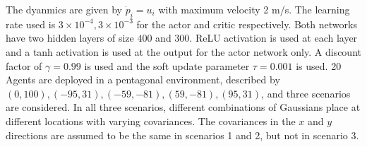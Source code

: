 \documentclass[landscape,a0paper,fontscale=0.292]{baposter}
\begin{document}
\begin{poster}
{
	The dyanmics are given by $\dot{p}_i = u_i$ with maximum velocity 2 m/s. The learning rate used is $3 \times 10^{-4}, 3\times 10^{-3}$ for the actor and critic respectively. Both networks have two hidden layers of size $400$ and $300$. ReLU activation is used at each layer and a tanh activation is used at the output for the actor network only. A discount factor of $\gamma = 0.99$ is used and the soft update parameter $\tau = 0.001$ is used. 20 Agents are deployed in a pentagonal environment, described by $(0,100), (-95,31), (-59,-81), (59,-81), (95,31)$, and three scenarios are considered. In all three scenarios, different combinations of Gaussians place at different locations with varying covariances. The covariances in the $x$ and $y$ directions are assumed to be the same in scenarios 1 and 2, but not in scenario 3.
}


\end{poster}
\end{document}
